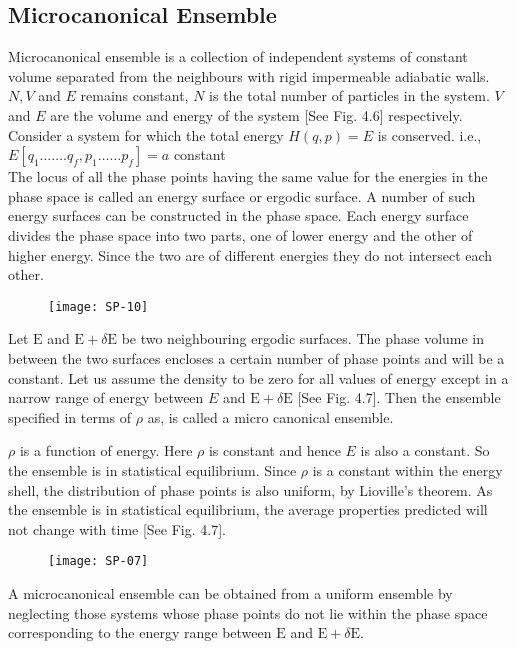 \subsection{Microcanonical Ensemble}
Microcanonical ensemble is a collection of independent systems of constant volume separated from the neighbours with rigid impermeable adiabatic walls. $N, V$ and $E$ remains constant, $N$ is the total number of particles in the system. $V$ and $E$ are the volume and energy of the system [See Fig. 4.6] respectively.\\
Consider a system for which the total energy $H(q, p)=E$ is conserved. i.e., $E\left[q_{1} \ldots \ldots . q_{f}, p_{1} \ldots \ldots p_{f}\right]=a$ constant\\
The locus of all the phase points having the same value for the energies in the phase space is called an energy surface or ergodic surface. A number of such energy surfaces can be constructed in the phase space. Each energy surface divides the phase space into two parts, one of lower energy and the other of higher energy. Since the two are of different energies they do not intersect each other.
\begin{figure}[H]
	\centering
	\texttt{[image: SP-10]}
\end{figure}
Let $\mathrm{E}$ and $\mathrm{E}+\delta \mathrm{E}$ be two neighbouring ergodic surfaces. The phase volume in between the two surfaces encloses a certain number of phase points and will be a constant. Let us assume the density to be zero for all values of energy except in a narrow range of energy between $E$ and $\mathrm{E}+\delta \mathrm{E}$ [See Fig. 4.7]. Then the ensemble specified in terms of $\rho$ as, is called a micro canonical ensemble.

$\rho$ is a function of energy. Here $\rho$ is constant and hence $E$ is also a constant. So the ensemble is in statistical equilibrium. Since $\rho$ is a constant within the energy shell, the distribution of phase points is also uniform, by Lioville's theorem. As the ensemble is in statistical equilibrium, the average properties predicted will not change with time [See Fig. 4.7].\\
\begin{figure}[H]
	\centering
	\texttt{[image: SP-07]}
\end{figure}
A microcanonical ensemble can be obtained from a uniform ensemble by neglecting those systems whose phase points do not lie within the phase space corresponding to the energy range between $\mathrm{E}$ and $\mathrm{E}+\delta \mathrm{E}$.

